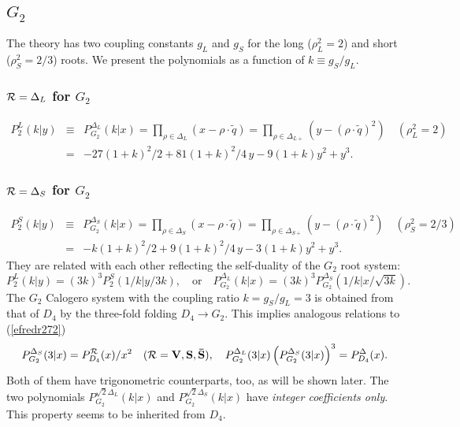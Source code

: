 \documentclass[a4paper,12pt]{article}
\begin{document}
\subsection{$G_2$}

The theory has two coupling constants $g_L$ and $g_S$ for the long
($\rho_L^2=2$) and short ($\rho_S^2=2/3$) roots.
We present the polynomials as a function of $k\equiv g_S/g_L$.

\subsubsection{${\cal R}=\Delta_L$ for $G_2$}

\begin{eqnarray}
   P_2^L(k|y)&\!\!\equiv\!\!&P_{G_2}^{\Delta_L}(k|x)=
   \prod_{\rho\in{\Delta_{L}}}\left(x-\rho\cdot\tilde{q}\right)
   =\prod_{\rho\in{\Delta_{L+}}}\left(y-(\rho\cdot\tilde{q})^2\right)
   \quad (\rho_L^2=2) \nonumber\\
%
   &\!\!=\!\!&-27(1 + k)^2/2 + 81(1 + k)^2/4\,y - 9(1 + k)y^2 + y^3.
\end{eqnarray}

\subsubsection{${\cal R}=\Delta_S$ for $G_2$}

\begin{eqnarray}
   P_2^S(k|y)&\!\!\equiv\!\!&P_{G_2}^{\Delta_S}(k|x)=
   \prod_{\rho\in{\Delta_{S}}}\left(x-\rho\cdot\tilde{q}\right)
   =\prod_{\rho\in{\Delta_{S+}}}\left(y-(\rho\cdot\tilde{q})^2\right)
   \quad (\rho_S^2=2/3) \nonumber\\
%
   &\!\!=\!\!& -k(1 + k)^2/2 + 9(1 + k)^2/4\,y - 3(1 + k)y^2 + y^3.
   \label{grsr}
\end{eqnarray}
They are related with each other reflecting the self-duality of
the $G_2$ root system:
\begin{equation}
   P_{2}^{L}(k|y)=(3k)^3P_{2}^{S}(1/k|y/3k),\quad \mbox{or}\quad
   P_{G_2}^{\Delta_L}(k|x)=(3k)^3P_{G_2}^{\Delta_S}(1/k|x/\sqrt{3k}).
\end{equation}
The $G_2$ Calogero system with the coupling ratio $k=g_S/g_L=3$
is obtained from that of $D_4$ by the three-fold folding $D_4\to G_2$.
This implies  analogous relations to (\ref{efredr272})
\begin{equation}
   P_{G_2}^{\Delta_S}(3|x)=P_{D_4}^{{\cal R}}(x)/x^2\quad
   ({\cal R}={\bf V}, {\bf S}, {\bf \bar{S}}),\quad
   P_{G_2}^{\Delta_L}(3|x)\left(P_{G_2}^{\Delta_S}(3|x)\right)^3=
   P_{D_4}^{\Delta}(x).
   \label{ratd4g2}
\end{equation}
Both of them have trigonometric counterparts, too, as will be shown later.
The two polynomials $P_{G_2}^{\sqrt{2}\Delta_L}(k|x)$ and
$P_{G_2}^{\sqrt{2}\Delta_S}(k|x)$ have {\em integer coefficients only\/}.
This property seems to be  inherited from $D_4$.
\end{document}
